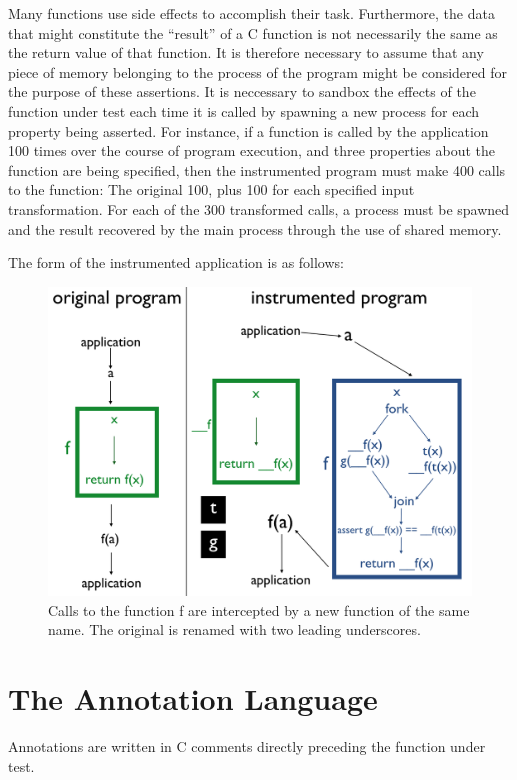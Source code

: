 \documentclass[notitlepage]{article}
\begin{document}
Many functions use side effects to accomplish their task. Furthermore, the data that might constitute the ``result'' of a C function is not necessarily the same as the return value of that function. It is therefore necessary to assume that any piece of memory belonging to the process of the program might be considered for the purpose of these assertions. It is neccessary to sandbox the effects of the function under test each time it is called by spawning a new process for each property being asserted. For instance, if a function is called by the application 100 times over the course of program execution, and three properties about the function are being specified, then the instrumented program must make 400 calls to the function: The original 100, plus 100 for each specified input transformation. For each of the 300 transformed calls, a process must be spawned and the result recovered by the main process through the use of shared memory.

The form of the instrumented application is as follows:

\begin{figure}[ht!]
\centering
\includegraphics[width=175mm]{calico_pic2.png}
\caption{Calls to the function f are intercepted by a new function of the same name. The original is renamed with two leading underscores.}
\end{figure}

\section{The Annotation Language}

Annotations are written in C comments directly preceding the function under test.
\end{document}
